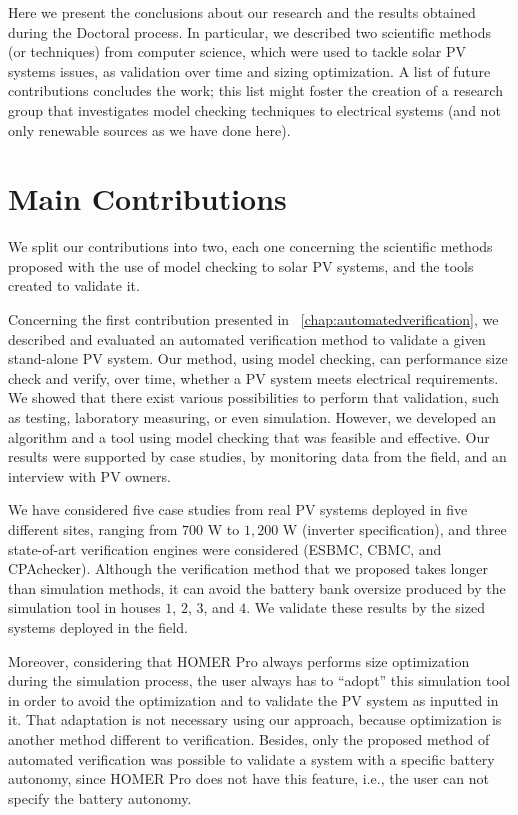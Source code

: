 Here we present the conclusions about our research and the results obtained during the Doctoral process. In particular, we described two scientific methods (or techniques) from computer science, which were used to tackle solar PV systems issues, as validation over time and sizing optimization. A list of future contributions concludes the work; this list might foster the creation of a research group that investigates model checking techniques to electrical systems (and not only renewable sources as we have done here).

\section{Main Contributions}

We split our contributions into two, each one concerning the scientific methods proposed with the use of model checking to solar PV systems, and the tools created to validate it.

Concerning the first contribution presented in ~\autoref{chap:automatedverification}, we described and evaluated an automated verification method to validate a given stand-alone PV system. Our method, using model checking, can performance size check and verify, over time, whether a PV system meets electrical requirements. We showed that there exist various possibilities to perform that validation, such as testing, laboratory measuring, or even simulation. However, we developed an algorithm and a tool using model checking that was feasible and effective. Our results were supported by case studies, by monitoring data from the field, and an interview with PV owners.

We have considered five case studies from real PV systems deployed in five different sites, ranging from $700$ W to $1,200$ W (inverter specification), and three state-of-art verification engines were considered (ESBMC, CBMC, and CPAchecker). Although the verification method that we proposed takes longer than simulation methods, it can avoid the battery bank oversize produced by the simulation tool in houses $1$, $2$, $3$, and $4$. We validate these results by the sized systems deployed in the field.

Moreover, considering that HOMER Pro always performs size optimization during the simulation process, the user always has to ``adopt'' this simulation tool in order to avoid the optimization and to validate the PV system as inputted in it. That adaptation is not necessary using our approach, because optimization is another method different to verification. Besides, only the proposed method of automated verification was possible to validate a system with a specific battery autonomy, since HOMER Pro does not have this feature, i.e., the user can not specify the battery autonomy.

